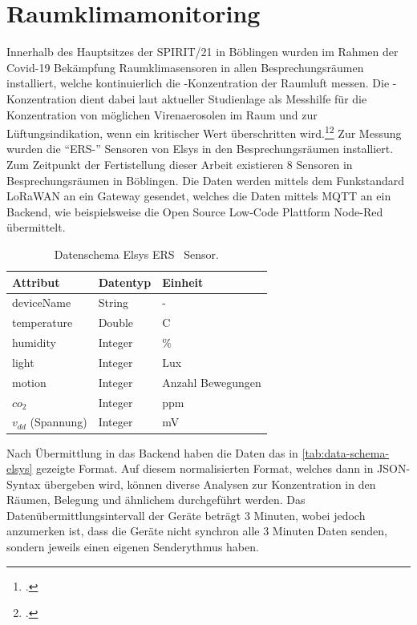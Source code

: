 
\section{Raumklimamonitoring}
Innerhalb des Hauptsitzes der SPIRIT/21 in Böblingen wurden im Rahmen der Covid-19 Bekämpfung Raumklimasensoren in allen Besprechungsräumen installiert, welche kontinuierlich die \coo{}-Konzentration der Raumluft messen. Die \coo{}-Konzentration dient dabei laut aktueller Studienlage als Messhilfe für die Konzentration von möglichen Virenaerosolen im Raum und zur Lüftungsindikation, wenn ein kritischer Wert überschritten wird.\footcite[Vgl.][]{Hartmann.2020}\nzitat\footcite[Vgl.][]{Peng.2020} Zur Messung wurden die \enquote{ERS-\coo{}} Sensoren von Elsys in den Besprechungsräumen installiert. Zum Zeitpunkt der Fertistellung dieser Arbeit existieren 8 Sensoren in Besprechungsräumen in Böblingen. Die Daten werden mittels dem Funkstandard \ac{LoRaWAN} an ein Gateway gesendet, welches die Daten mittels \ac{MQTT} an ein Backend, wie beispielsweise die Open Source Low-Code Plattform Node-Red übermittelt. 

\begin{table}[H]
\centering
\begin{tabular}{|l|l|l|}
\hline
Attribut    & Datentyp & Einheit           \\ \hline
deviceName  & String   & -                 \\ \hline
temperature & Double   & \textdegree{}C     \\ \hline
humidity    & Integer  & \%                \\ \hline
light       & Integer  & Lux               \\ \hline
motion      & Integer  & Anzahl Bewegungen \\ \hline
$co_2$        & Integer  & ppm               \\ \hline
$v_{dd}$ (Spannung)         & Integer  & mV                \\ \hline
\end{tabular}
\caption[Datenschema Elsys ERS \coo{}~Sensor]{Datenschema Elsys ERS \coo{}~Sensor.\footnotemark}
\label{tab:data-schema-elsys}
\end{table}
Nach Übermittlung in das Backend haben die Daten das in \autoref{tab:data-schema-elsys} gezeigte Format. Auf diesem normalisierten Format, welches dann in \ac{JSON}-Syntax übergeben wird, können diverse Analysen zur \coo{} Konzentration in den Räumen, Belegung und ähnlichem durchgeführt werden. Das Datenübermittlungsintervall der Geräte beträgt 3 Minuten, wobei jedoch anzumerken ist, dass die Geräte nicht synchron alle 3 Minuten Daten senden, sondern jeweils einen eigenen Senderythmus haben.

